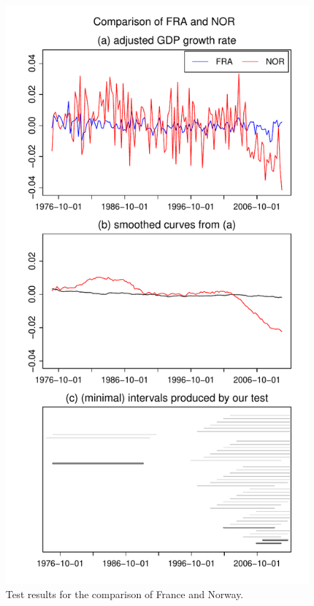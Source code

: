 \documentclass[a4paper,12pt]{article}
\begin{document}
\begin{figure}[p!]

\begin{minipage}[t]{0.49\textwidth}
\includegraphics[width=\textwidth]{Plots/FRA_vs_NOR}
\caption{Test results for the comparison of France and Norway.}\label{fig:France:Norway}
\end{minipage}

\end{figure}
\end{document}
